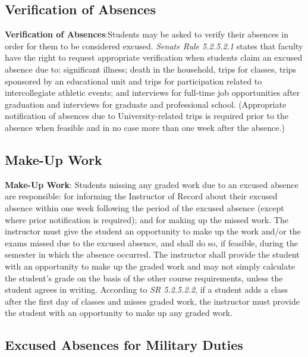 \documentclass[
  letterpaper,
  DIV=11,
  numbers=noendperiod]{scrartcl}
\begin{document}
\hypertarget{verification-of-absences}{%
\subsection{Verification of Absences}\label{verification-of-absences}}

\textbf{Verification of Absences}:Students may be asked to verify their
absences in order for them to be considered excused. \emph{Senate Rule
5.2.5.2.1} states that faculty have the right to request appropriate
verification when students claim an excused absence due to: significant
illness; death in the household, trips for classes, trips sponsored by
an educational unit and trips for participation related to
intercollegiate athletic events; and interviews for full-time job
opportunities after graduation and interviews for graduate and
professional school. (Appropriate notification of absences due to
University-related trips is required prior to the absence when feasible
and in no case more than one week after the absence.)

\hypertarget{make-up-work}{%
\subsection{Make-Up Work}\label{make-up-work}}

\textbf{Make-Up Work}: Students missing any graded work due to an
excused absence are responsible: for informing the Instructor of Record
about their excused absence within one week following the period of the
excused absence (except where prior notification is required); and for
making up the missed work. The instructor must give the student an
opportunity to make up the work and/or the exams missed due to the
excused absence, and shall do so, if feasible, during the semester in
which the absence occurred. The instructor shall provide the student
with an opportunity to make up the graded work and may not simply
calculate the student's grade on the basis of the other course
requirements, unless the student agrees in writing. According to
\emph{SR 5.2.5.2.2}, if a student adds a class after the first day of
classes and misses graded work, the instructor must provide the student
with an opportunity to make up any graded work.

\hypertarget{excused-absences-for-military-duties}{%
\subsection{Excused Absences for Military
Duties}\label{excused-absences-for-military-duties}}
\end{document}
